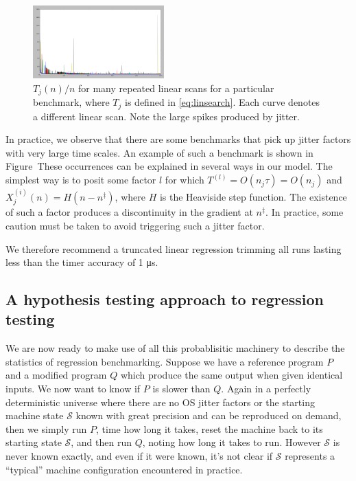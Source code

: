 \documentclass[conference]{IEEEtran}
\begin{document}
\begin{figure}
\centering
\includegraphics[width=0.45\textwidth]{experiments/images/fmanytrials_wide}
\caption{$T_j(n)/n$ for many repeated linear scans for a particular benchmark, where $T_j$ is defined in \eqref{eq:linsearch}. Each curve denotes a different linear scan. Note the large spikes produced by jitter.}
\label{fig:scaling}
\end{figure}

In practice, we observe that there are some benchmarks that pick up jitter factors with very large time scales. An example of such a benchmark is shown in Figure~These occurrences can be explained in several ways in our model. The simplest way is to posit some factor $l$ for which $T^{(l)} = O(n_j \tau) = O(n_j)$ and $X_j^{(i)}(n) = H(n - n^\ddagger)$,
where $H$ is the Heaviside step function. The existence of such a factor produces a discontinuity in the gradient at $n^\ddagger$. In practice, some caution must be taken to avoid triggering such a jitter factor.

We therefore recommend a truncated linear regression trimming all runs lasting less than the timer accuracy of 1 μs.


\subsection{A hypothesis testing approach to regression testing}

We are now ready to make use of all this probablisitic machinery to describe the statistics of regression benchmarking. Suppose we have a reference program $P$ and a modified program $Q$ which produce the same output when given identical inputs. We now want to know if $P$ is slower than $Q$. Again in a perfectly deterministic universe where there are no OS jitter factors or the starting machine state $\mathcal S$ known with great precision and can be reproduced on demand, then we simply run $P$, time how long it takes, reset the machine back to its starting state $\mathcal S$, and then run $Q$, noting how long it takes to run. However $\mathcal S$ is never known exactly, and even if it were known, it's not clear if
$\mathcal S$ represents a ``typical'' machine configuration encountered in practice.
\end{document}
